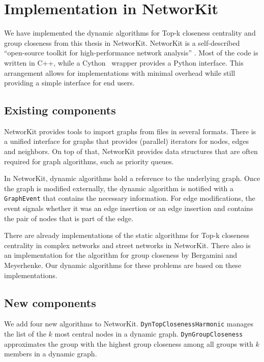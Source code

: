 \chapter{Implementation in NetworKit}
\label{ch:implementation}

We have implemented the dynamic algorithms for Top-k closeness centrality and group closeness from this thesis in NetworKit. NetworKit is a self-described ``open-source toolkit for high-performance network analysis'' \cite{staudt2014networkit}. Most of the code is written in C++, while a Cython~\cite{behnel2010cython} wrapper provides a Python interface. This arrangement allows for implementations with minimal overhead while still providing a simple interface for end users.

\section{Existing components}

NetworKit provides tools to import graphs from files in several formats. There is a unified interface for graphs that provides (parallel) iterators for nodes, edges and neighbors. On top of that, NetworKit provides data structures that are often required for graph algorithms, such as priority queues.

In NetworKit, dynamic algorithms hold a reference to the underlying graph. Once the graph is modified externally, the dynamic algorithm is notified with a \texttt{GraphEvent} that contains the necessary information. For edge modifications, the event signals whether it was an edge insertion or an edge insertion and contains the pair of nodes that is part of the edge.

There are already implementations of the static algorithms for Top-k closeness centrality in complex networks and street networks in NetworKit. There also is an implementation for the algorithm for group closeness by Bergamini and Meyerhenke. Our dynamic algorithms for these problems are based on these implementations.

\section{New components}
We add four new algorithms to NetworKit. \texttt{DynTopClosenessHarmonic} manages the list of the $k$ most central nodes in a dynamic graph. \texttt{DynGroupCloseness} approximates the group with the highest group closeness among all groups with $k$ members in a dynamic graph. 


